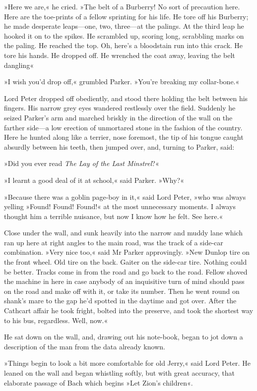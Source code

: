 »Here we are,« he cried. »The belt of a Burberry! No sort of precaution here. Here are the toe-prints of a fellow sprinting for his life. He tore off his Burberry; he made desperate leaps—one, two, three—at the palings. At the third leap he hooked it on to the spikes. He scrambled up, scoring long, scrabbling marks on the paling. He reached the top. Oh, here's a bloodstain run into this crack. He tore his hands. He dropped off. He wrenched the coat away, leaving the belt dangling\longdash«

»I wish you'd drop off,« grumbled Parker. »You're breaking my collar-bone.«

Lord Peter dropped off obediently, and stood there holding the belt between his fingers. His narrow grey eyes wandered restlessly over the field. Suddenly he seized Parker's arm and marched briskly in the direction of the wall on the farther side—a low erection of unmortared stone in the fashion of the country. Here he hunted along like a terrier, nose foremost, the tip of his tongue caught absurdly between his teeth, then jumped over, and, turning to Parker, said:

»Did you ever read \textit{The Lay of the Last Minstrel}?«

»I learnt a good deal of it at school,« said Parker. »Why?«

»Because there was a goblin page-boy in it,« said Lord Peter, »who was always yelling »Found! Found! Found!« at the most unnecessary moments.  I always thought him a terrible nuisance, but now I know how he felt.  See here.«

Close under the wall, and sunk heavily into the narrow and muddy lane which ran up here at right angles to the main road, was the track of a side-car combination.
»Very nice too,« said Mr Parker approvingly. »New Dunlop tire on the front wheel. Old tire on the back. Gaiter on the side-car tire.  Nothing could be better. Tracks come in from the road and go back to the road. Fellow shoved the machine in here in case anybody of an inquisitive turn of mind should pass on the road and make off with it, or take its number. Then he went round on shank's mare to the gap he'd spotted in the daytime and got over. After the Cathcart affair he took fright, bolted into the preserve, and took the shortest way to his bus, regardless. Well, now.«

He sat down on the wall, and, drawing out his note-book, began to jot down a description of the man from the data already known.

»Things begin to look a bit more comfortable for old Jerry,« said Lord Peter. He leaned on the wall and began whistling softly, but with great accuracy, that elaborate passage of Bach which begins »Let Zion's children«.


